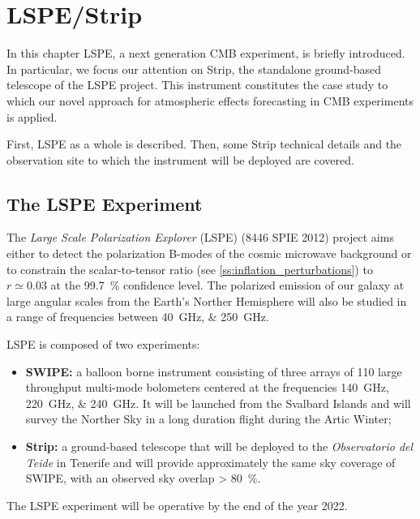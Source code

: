 \chapter{LSPE/Strip}

In this chapter LSPE, a next generation CMB experiment, is briefly
introduced. In particular, we focus our attention on Strip, the standalone
ground-based telescope of the LSPE project. This instrument constitutes the
case study to which our novel approach for atmospheric effects forecasting
in CMB experiments is applied.

First, LSPE as a whole is described. Then, some Strip technical details and
the observation site to which the instrument will be deployed are covered.

\section{The LSPE Experiment}

The \emph{Large Scale Polarization Explorer} (LSPE) (8446 SPIE 2012)
project aims either to detect the polarization B-modes of the cosmic
microwave background or to constrain the scalar-to-tensor ratio (see
\autoref{ss:inflation_perturbations}) to $r \simeq 0.03$ at the
\SI{99.7}{\percent} confidence level. The polarized emission of our galaxy
at large angular scales from the Earth's Norther Hemisphere will also be
studied in a range of frequencies between \SIlist{40;250}{\giga\hertz}.

LSPE is composed of two experiments:

\begin{itemize}
        \item \textbf{SWIPE:} a balloon borne instrument consisting of
        three arrays of \num{110} large throughput multi-mode bolometers
        centered at the frequencies \SIlist{140;220;240}{\giga\hertz}. It
        will be launched from the Svalbard Islands and will survey the Norther
        Sky in a long duration flight during the Artic Winter;

        \item \textbf{Strip:} a ground-based telescope that will be
        deployed to the \emph{Observatorio del Teide} in Tenerife and will
        provide approximately the same sky coverage of SWIPE, with an
        observed sky overlap \SI{> 80}{\percent}.
\end{itemize}

The LSPE experiment will be operative by the end of the year 2022.

